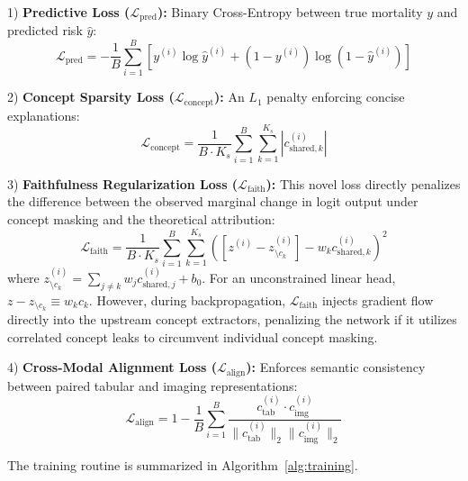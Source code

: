\documentclass[10pt,journal,compsoc,twocolumn]{IEEEtran}
\begin{document}
1) \textbf{Predictive Loss ($\mathcal{L}_{\text{pred}}$):} Binary Cross-Entropy between true mortality $y$ and predicted risk $\hat{y}$:
\begin{equation}
    \mathcal{L}_{\text{pred}} = -\frac{1}{B} \sum_{i=1}^B \left[ y^{(i)} \log \hat{y}^{(i)} + (1 - y^{(i)}) \log(1 - \hat{y}^{(i)}) \right]
\end{equation}

2) \textbf{Concept Sparsity Loss ($\mathcal{L}_{\text{concept}}$):} An $L_1$ penalty enforcing concise explanations:
\begin{equation}
    \mathcal{L}_{\text{concept}} = \frac{1}{B \cdot K_s} \sum_{i=1}^B \sum_{k=1}^{K_s} \left| c_{\text{shared}, k}^{(i)} \right|
\end{equation}

3) \textbf{Faithfulness Regularization Loss ($\mathcal{L}_{\text{faith}}$):} This novel loss directly penalizes the difference between the observed marginal change in logit output under concept masking and the theoretical attribution:
\begin{equation}
    \mathcal{L}_{\text{faith}} = \frac{1}{B \cdot K_s} \sum_{i=1}^B \sum_{k=1}^{K_s} \left( \left[ z^{(i)} - z^{(i)}_{\setminus c_k} \right] - w_k c_{\text{shared}, k}^{(i)} \right)^2
\end{equation}
where $z^{(i)}_{\setminus c_k} = \sum_{j \neq k} w_j c_{\text{shared}, j}^{(i)} + b_0$. For an unconstrained linear head, $z - z_{\setminus c_k} \equiv w_k c_k$. However, during backpropagation, $\mathcal{L}_{\text{faith}}$ injects gradient flow directly into the upstream concept extractors, penalizing the network if it utilizes correlated concept leaks to circumvent individual concept masking.

4) \textbf{Cross-Modal Alignment Loss ($\mathcal{L}_{\text{align}}$):} Enforces semantic consistency between paired tabular and imaging representations:
\begin{equation}
    \mathcal{L}_{\text{align}} = 1 - \frac{1}{B} \sum_{i=1}^B \frac{c_{\text{tab}}^{(i)} \cdot c_{\text{img}}^{(i)}}{\|c_{\text{tab}}^{(i)}\|_2 \|c_{\text{img}}^{(i)}\|_2}
\end{equation}

The training routine is summarized in Algorithm~\ref{alg:training}.
\end{document}
